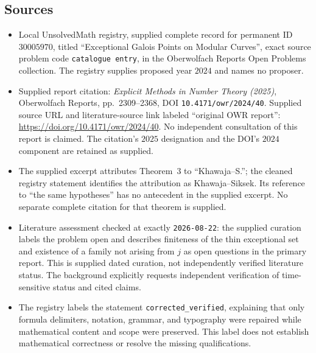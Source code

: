 \documentclass[11pt]{article}
\begin{document}
\subsection{Sources}
\begin{itemize}
\item Local UnsolvedMath registry, supplied complete record for permanent ID \(30005970\), titled ``Exceptional Galois Points on Modular Curves'', exact source problem code \texttt{catalogue entry}, in the Oberwolfach Reports Open Problems collection. The registry supplies proposed year \(2024\) and names no proposer.
\item Supplied report citation: \emph{Explicit Methods in Number Theory (2025)}, Oberwolfach Reports, pp.~2309--2368, DOI \texttt{10.4171/owr/2024/40}. Supplied source URL and literature-source link labeled ``original OWR report'': \url{https://doi.org/10.4171/owr/2024/40}. No independent consultation of this report is claimed. The citation's \(2025\) designation and the DOI's \(2024\) component are retained as supplied.
\item The supplied excerpt attributes Theorem~3 to ``Khawaja--S.''; the cleaned registry statement identifies the attribution as Khawaja--Siksek. Its reference to ``the same hypotheses'' has no antecedent in the supplied excerpt. No separate complete citation for that theorem is supplied.
\item Literature assessment checked at exactly \texttt{2026-08-22}: the supplied curation labels the problem open and describes finiteness of the thin exceptional set and existence of a family not arising from \(j\) as open questions in the primary report. This is supplied dated curation, not independently verified literature status. The background explicitly requests independent verification of time-sensitive status and cited claims.
\item The registry labels the statement \texttt{corrected\_verified}, explaining that only formula delimiters, notation, grammar, and typography were repaired while mathematical content and scope were preserved. This label does not establish mathematical correctness or resolve the missing qualifications.
\end{itemize}
\end{document}
